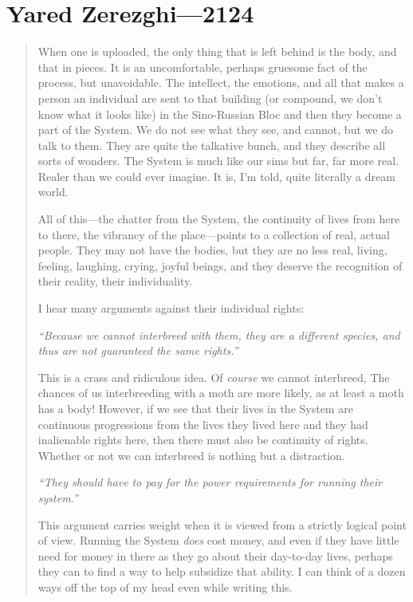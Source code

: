 \hypertarget{yared-zerezghi-2124}{%
\chapter{Yared Zerezghi---2124}\label{yared-zerezghi-2124}}

\begin{quote}
When one is uploaded, the only thing that is left behind is the body, and that in pieces. It is an uncomfortable, perhaps gruesome fact of the process, but unavoidable. The intellect, the emotions, and all that makes a person an individual are sent to that building (or compound, we don't know what it looks like) in the Sino-Russian Bloc and then they become a part of the System. We do not see what they see, and cannot, but we do talk to them. They are quite the talkative bunch, and they describe all sorts of wonders. The System is much like our sims but far, far more real. Realer than we could ever imagine. It is, I'm told, quite literally a dream world.

All of this---the chatter from the System, the continuity of lives from here to there, the vibrancy of the place---points to a collection of real, actual people. They may not have the bodies, but they are no less real, living, feeling, laughing, crying, joyful beings, and they deserve the recognition of their reality, their individuality.

I hear many arguments against their individual rights:\pagebreak

\emph{``Because we cannot interbreed with them, they are a different species, and thus are not guaranteed the same rights.''}

This is a crass and ridiculous idea. Of \emph{course} we cannot interbreed, The chances of us interbreeding with a moth are more likely, as at least a moth has a body! However, if we see that their lives in the System are continuous progressions from the lives they lived here and they had inalienable rights here, then there must also be continuity of rights. Whether or not we can interbreed is nothing but a distraction.

\emph{``They should have to pay for the power requirements for running their system.''}

This argument carries weight when it is viewed from a strictly logical point of view. Running the System \emph{does} cost money, and even if they have little need for money in there as they go about their day-to-day lives, perhaps they can to find a way to help subsidize that ability. I can think of a dozen ways off the top of my head even while writing this.


\end{quote}
